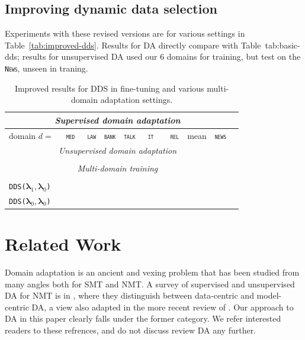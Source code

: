 \documentclass[11pt,a4paper]{article}
\newcommand{\fyTodo}[1]{\Todo[FY:]{\textcolor{orange}{#1}}}
\newcommand{\domain}[1]{\texttt{\textsc{#1}}}
\newcommand{\system}[1]{\texttt{{#1}}}
\newcommand{\vlambda}{\ensuremath{\boldsymbol\lambda}\xspace} %
\begin{document}
\subsection{Improving dynamic data selection}

Experiments with these revised versions are for various settings in Table~\ref{tab:improved-dds}. Results for DA directly compare with Table~{tab:basic-dds}; results for unsupervised DA used our 6 domains for training, but test on the \domain{News}, unseen in traning.
\begin{table}
  \centering \small
  \begin{tabular}{|l|*9{r|}} \hline
    \multicolumn{9}{|c|}{\sl Supervised domain adaptation} \\ \hline
    domain \hfill $d=$ & \multicolumn{1}{c|}{\domain{ med}} & \multicolumn{1}{c|}{\domain{ law}} & \multicolumn{1}{c|}{\domain{bank}} & \multicolumn{1}{c|}{\domain{talk}} & \multicolumn{1}{c|}{\domain{ it }} & \multicolumn{1}{c|}{\domain{ rel}} & \multicolumn{1}{c|}{mean} & \multicolumn{1}{|c|}{\domain{news}} \\ \hline \hline
    \multicolumn{9}{|c|}{\sl Unsupervised domain adaptation} \\ \hline
    \\  \hline\hline 
    \multicolumn{9}{|c|}{\sl Multi-domain training} \\ \hline
    \\
    \system{DDS($\vlambda_1, \vlambda_0$)} & \\
    \system{DDS($\vlambda_0, \vlambda_0$)} & \\ \hline
  \end{tabular}
  \caption{Improved results for DDS in fine-tuning and various multi-domain adaptation settings.}
  \label{tab:basic-dds}
\end{table}

\fyTodo{Refaire table 3 + (unsupervised domain in source= classification) + new domain}

\section{Related Work \label{sec:related}}

Domain adaptation is an ancient and vexing problem that has been studied from many angles both for SMT and NMT. A survey of supervised and unsupervised DA for NMT is in \cite{Chu18asurvey}, where they distinguish between data-centric and model-centric DA, a view also adapted in the more recent review of \cite{Saunders21domain}. Our approach to DA in this paper clearly falls under the former category. We refer interested readers to these refrences, and do not discuss review DA any further.
\end{document}
